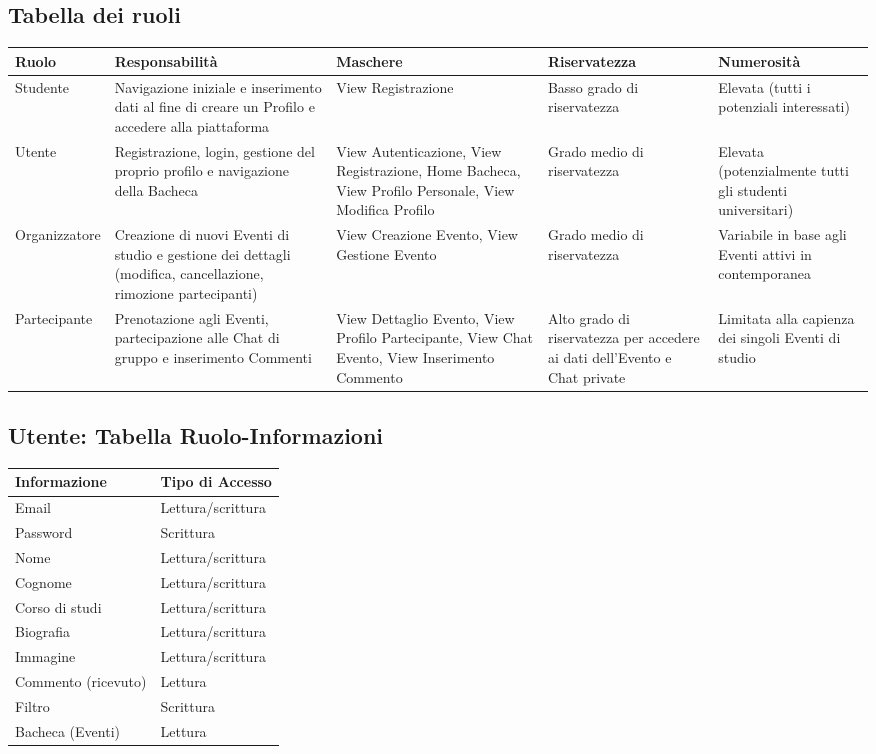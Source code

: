 \documentclass[12pt,a4paper]{report}
\begin{document}
\subsection{Tabella dei ruoli}
\begin{tabularx}{\textwidth}{|p{2.5cm}|X|p{3.5cm}|p{2cm}|X|}
    \hline
    \rowcolor{studyColor} \textbf{Ruolo} & \textbf{Responsabilità} & \textbf{Maschere} & \textbf{Riservatezza} & \textbf{Numerosità} \\ \hline
    \endhead
    Studente & Navigazione iniziale e inserimento dati al fine di creare un Profilo e accedere alla piattaforma & View Registrazione & Basso grado di riservatezza & Elevata (tutti i potenziali interessati) \\ \hline
    Utente & Registrazione, login, gestione del proprio profilo e navigazione della Bacheca & View Autenticazione, View Registrazione, Home Bacheca, View Profilo Personale, View Modifica Profilo & Grado medio di riservatezza & Elevata (potenzialmente tutti gli studenti universitari) \\ \hline
    Organizzatore & Creazione di nuovi Eventi di studio e gestione dei dettagli (modifica, cancellazione, rimozione partecipanti) & View Creazione Evento, View Gestione Evento & Grado medio di riservatezza & Variabile in base agli Eventi attivi in contemporanea \\ \hline
    Partecipante & Prenotazione agli Eventi, partecipazione alle Chat di gruppo e inserimento Commenti & View Dettaglio Evento, View Profilo Partecipante, View Chat Evento, View Inserimento Commento & Alto grado di riservatezza per accedere ai dati dell'Evento e Chat private & Limitata alla capienza dei singoli Eventi di studio \\ \hline
\end{tabularx}

\subsection{Utente: Tabella Ruolo-Informazioni}
\begin{tabularx}{\textwidth}{|X|X|}
    \hline
    \rowcolor{studyColor} \textbf{Informazione} & \textbf{Tipo di Accesso} \\ \hline
    \endhead
    Email & Lettura/scrittura \\ \hline
    Password & Scrittura \\ \hline
    Nome & Lettura/scrittura \\ \hline
    Cognome & Lettura/scrittura \\ \hline
    Corso di studi & Lettura/scrittura \\ \hline
    Biografia & Lettura/scrittura \\ \hline
    Immagine & Lettura/scrittura \\ \hline
    Commento (ricevuto) & Lettura \\ \hline
    Filtro & Scrittura \\ \hline
    Bacheca (Eventi) & Lettura \\ \hline
\end{tabularx}
\end{document}
